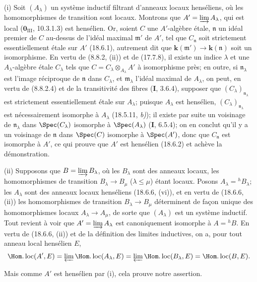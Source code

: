 (i) Soit $(A_\lambda)$ un système inductif filtrant d'anneaux locaux henséliens, où les homomorphismes de transition sont locaux. Montrons que $A'=\varinjlim A_\lambda$, qui est local ($\mathbf{0}_{\mathrm{III}}$, 10.3.1.3) est hensélien. Or, soient $C$ une $A'$-algèbre étale, $\mathfrak n$ un idéal premier
de $C$ au-dessus de l'idéal maximal $\mathfrak m'$ de $A'$, tel que $C_{\mathfrak n}$ soit strictement essentiellement étale sur $A'$ (18.6.1), autrement dit que $\boldsymbol{k}(\mathfrak m')\to \boldsymbol{k}(\mathfrak n)$ soit un isomorphisme. En vertu de (8.8.2, (ii)) et de (17.7.8), il existe un indice $\lambda$ et une $A_\lambda$-algèbre étale $C_\lambda$ tels que $C=C_\lambda\otimes_{A_\lambda}A'$ à isomorphisme près; en outre, si $\mathfrak n_\lambda$ est l'image réciproque de $\mathfrak n$ dans $C_\lambda$, et $\mathfrak m_\lambda$ l'idéal maximal de $A_\lambda$, on peut, en vertu de (8.8.2.4) et de la transitivité des fibres (\textbf{I}, 3.6.4), supposer que $(C_\lambda)_{\mathfrak n_\lambda}$ est strictement essentiellement étale sur $A_\lambda$; puisque $A_\lambda$ est hensélien, $(C_\lambda)_{\mathfrak n_\lambda}$ est nécessairement isomorphe à $A_\lambda$ (18.5.11, \emph{b)}); il existe par suite un voisinage de $\mathfrak n_\lambda$ dans $\Spec(C_\lambda)$ isomorphe à $\Spec(A_\lambda)$ (\textbf{I}, 6.5.4); on en conclut qu'il y a un voisinage de $\mathfrak n$ dans $\Spec(C)$ isomorphe à $\Spec(A')$, donc que $C_{\mathfrak n}$ est isomorphe à $A'$, ce qui prouve que $A'$ est hensélien (18.6.2) et achève la démonstration.

(ii) Supposons que $B=\varinjlim B_\lambda$, où les $B_\lambda$ sont des anneaux locaux, les homomorphismes de transition $B_\lambda\to B_\mu$ ($\lambda\leq\mu$) étant locaux. Posons $A_\lambda={}^h\!B_\lambda$; les $A_\lambda$ sont des anneaux locaux henséliens (18.6.6, (vi)), et en vertu de (18.6.6, (ii)) les homomorphismes de transition $B_\lambda\to B_\mu$ déterminent de façon unique des homomorphismes locaux $A_\lambda\to A_\mu$, de sorte que $(A_\lambda)$ est un système inductif. Tout revient à voir que $A'=\varinjlim A_\lambda$ est canoniquement isomorphe à $A={}^h\!B$. En vertu de (18.6.6, (ii)) et de la définition des limites inductives, on a, pour tout anneau local hensélien $E$,
\[
  \Hom.\operatorname{loc}(A',E)
  =\varprojlim\Hom.\operatorname{loc}(A_\lambda,E)
  =\varprojlim\Hom.\operatorname{loc}(B_\lambda,E)
  =\Hom.\operatorname{loc}(B,E).
\]

Mais comme $A'$ est hensélien par (i), cela prouve notre assertion.

